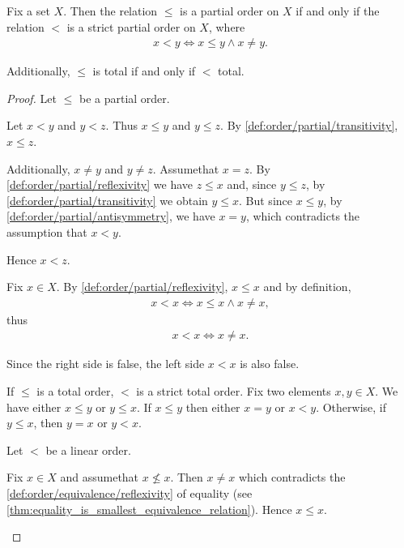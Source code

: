 \begin{proposition}\label{thm:strict_partial_order_conversion}
  Fix a set $X$. Then the relation $\leq$ is a partial order on $X$ if and only if the relation $<$ is a strict partial order on $X$, where
  \begin{align*}
    x < y \iff x \leq y \land x \neq y.
  \end{align*}

  Additionally, $\leq$ is total if and only if $<$ total.
\end{proposition}
\begin{proof}
  \Implies Let $\leq$ be a partial order.
  \begin{description}
     Let $x < y$ and $y < z$. Thus $x \leq y$ and $y \leq z$. By \ref{def:order/partial/transitivity}, $x \leq z$.

    Additionally, $x \neq y$ and $y \neq z$. Assume\LEM that $x = z$. By \ref{def:order/partial/reflexivity} we have $z \leq x$ and, since $y \leq z$, by \ref{def:order/partial/transitivity} we obtain $y \leq x$. But since $x \leq y$, by \ref{def:order/partial/antisymmetry}, we have $x = y$, which contradicts the assumption that $x < y$.

    Hence $x < z$.

     Fix $x \in X$. By \ref{def:order/partial/reflexivity}, $x \leq x$ and by definition,
    \begin{align*}
      x < x \iff x \leq x \land x \neq x,
    \end{align*}
    thus
    \begin{align*}
      x < x \iff x \neq x.
    \end{align*}

    Since the right side is false, the left side $x < x$ is also false.

     If $\leq$ is a total order, $<$ is a strict total order. Fix two elements $x, y \in X$. We have either $x \leq y$ or $y \leq x$. If $x \leq y$ then either $x = y$ or $x < y$. Otherwise, if $y \leq x$, then $y = x$ or $y < x$.
  \end{description}

  \ImpliedBy Let $<$ be a linear order.
  \begin{description}
     Fix $x \in X$ and assume\LEM that $x \not\leq x$. Then $x \neq x$ which contradicts the \ref{def:order/equivalence/reflexivity} of equality (see \cref{thm:equality_is_smallest_equivalence_relation}). Hence $x \leq x$.


\end{description}
\end{proof}
